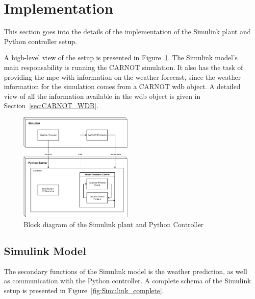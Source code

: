 \section{Implementation}

This section goes into the details of the implementation of the Simulink plant
and Python controller setup.

A high-level view of the setup is presented in Figure~\ref{fig:setup_diagram}.
The Simulink model's main responsability is running the CARNOT simulation. It
also has the task of providing the \acrshort{mpc} with information on the
weather forecast, since the weather information for the simulation comes from a
CARNOT \acrshort{wdb} object. A detailed view of all the information available
in the \acrshort{wdb} object is given in Section~\ref{sec:CARNOT_WDB}.


\begin{figure}[ht]
    \centering
    \includegraphics[width = 0.5\textwidth]{Images/setup_diagram.pdf}
    \caption{Block diagram of the Simulink plant and Python Controller}
    \label{fig:setup_diagram}
\end{figure}

\subsection{Simulink Model}

The secondary functions of the Simulink model is the weather prediction, as well
as communication with the Python controller. A complete schema of the Simulink
setup is presented in Figure~\ref{fig:Simulink_complete}.

